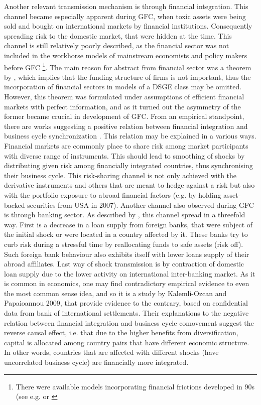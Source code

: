 \documentclass{article}
\begin{document}
Another relevant transmission mechanism is through financial integration. This channel became especially apparent during GFC, when toxic assets were being sold and bought on international markets by financial institutions. Consequently spreading risk to the domestic market, that were hidden at the time. This channel is still relatively poorly described, as the financial sector was not included in the workhorse models of mainstream economists and policy makers before GFC \footnote[4]{There were available models incorporating financial frictions developed in 90s (see e.g. \cite{bernanke_gertler} or \cite{Kiyotaki}}. The main reason for abstract from financial sector was a theorem by \cite{modigliani}, which implies that the funding structure of firms is not important, thus the incorporation of financial sectors in models of a DSGE class may be omitted. However, this theorem was formulated under assumptions of efficient financial markets with perfect information, and as it turned out the asymmetry of the former became crucial in development of GFC.  From an empirical standpoint, there are works suggesting a positive relation between financial integration and business cycle synchronization \cite{imbs}. This relation may be explained in a various ways. Financial markets are commonly place to share risk among market participants with diverse range of instruments. This should lead to smoothing of shocks by distributing given risk among financially integrated countries, thus synchronising their business cycle. This risk-sharing channel is not only achieved with the derivative instruments and others that are meant to hedge against a risk but also with the portfolio exposure to abroad financial factors (e.g. by holding asset-backed securities from USA in 2007). Another channel also observed during GFC is through banking sector. As described by \cite{cetorelli}, this channel spread in a threefold way. First is a decrease in a loan supply from foreign banks, that were subject of the initial shock or were located in a country affected by it. These banks try to curb risk during a stressful time by reallocating funds to safe assets (risk off).  Such foreign bank behaviour also exhibits itself with lower loans supply of their abroad affiliates. Last way of shock transmission is by contraction of domestic loan supply due to the lower activity on international inter-banking market. As it is common in economics, one may find contradictory empirical evidence to even the most common sense idea, and so it is a study by Kalemli-Ozcan and Papaioannou 2009, that provide evidence to the contrary, based on confidential data from bank of international settlements. Their explanations to the negative relation between financial integration and business cycle comovement suggest the reverse causal effect, i.e. that due to the higher benefits from diversification, capital is allocated among country pairs that have different economic structure. In other words, countries that are affected with different shocks (have uncorrelated business cycle) are financially more integrated.  
\end{document}

